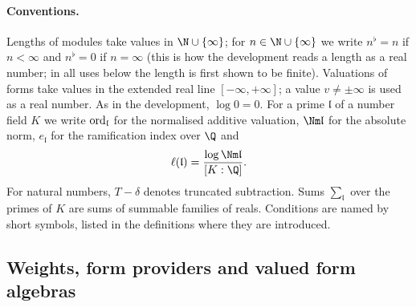\paragraph{Conventions.} Lengths of modules take values in $\N\cup\{\infty\}$; for $n\in\N\cup\{\infty\}$ we
write $n^\flat=n$ if $n<\infty$ and $n^\flat=0$ if $n=\infty$ (this is how the development reads a length
as a real number; in all uses below the length is first shown to be finite). Valuations of forms take
values in the extended real line $[-\infty,+\infty]$; a value $v\ne\pm\infty$ is used as a real number. As
in the development, $\log0=0$. For a prime $\mathfrak l$ of a number field $K$ we write
$\operatorname{ord}_{\mathfrak l}$ for the normalised additive valuation, $\Nm\mathfrak l$ for the absolute norm,
$e_{\mathfrak l}$ for the ramification index over $\Q$ and
\[
\ell(\mathfrak l)=\frac{\log\Nm\mathfrak l}{[K:\Q]}.
\]
For natural numbers, $T-\delta$ denotes truncated subtraction. Sums $\sum_{\mathfrak l}$ over the primes of
$K$ are sums of summable families of reals. Conditions are named by short symbols, listed in the
definitions where they are introduced.

\subsection{Weights, form providers and valued form algebras}\label{sec:pf:onto1:setting}

